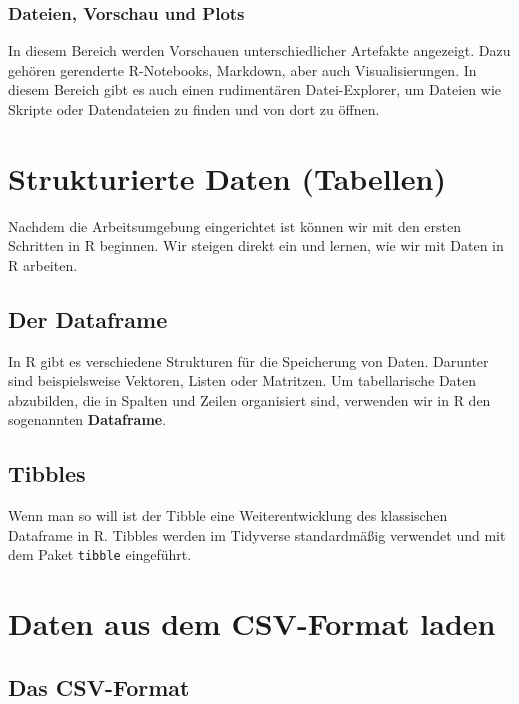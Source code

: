 \documentclass[
]{book}
\begin{document}
\hypertarget{dateien-vorschau-und-plots}{%
\subsection{Dateien, Vorschau und Plots}\label{dateien-vorschau-und-plots}}

In diesem Bereich werden Vorschauen unterschiedlicher Artefakte angezeigt. Dazu gehören gerenderte R-Notebooks, Markdown, aber auch Visualisierungen. In diesem Bereich gibt es auch einen rudimentären Datei-Explorer, um Dateien wie Skripte oder Datendateien zu finden und von dort zu öffnen.

\hypertarget{strukturierte-daten-tabellen}{%
\chapter{Strukturierte Daten (Tabellen)}\label{strukturierte-daten-tabellen}}

Nachdem die Arbeitsumgebung eingerichtet ist können wir mit den ersten Schritten in R beginnen. Wir steigen direkt ein und lernen, wie wir mit Daten in R arbeiten.

\hypertarget{der-dataframe}{%
\section{Der Dataframe}\label{der-dataframe}}

In R gibt es verschiedene Strukturen für die Speicherung von Daten. Darunter sind beispielsweise Vektoren, Listen oder Matritzen. Um tabellarische Daten abzubilden, die in Spalten und Zeilen organisiert sind, verwenden wir in R den sogenannten \textbf{Dataframe}.

\hypertarget{tibbles}{%
\section{Tibbles}\label{tibbles}}

Wenn man so will ist der Tibble eine Weiterentwicklung des klassischen Dataframe in R. Tibbles werden im Tidyverse standardmäßig verwendet und mit dem Paket \texttt{tibble} eingeführt.

\hypertarget{daten-aus-dem-csv-format-laden}{%
\chapter{Daten aus dem CSV-Format laden}\label{daten-aus-dem-csv-format-laden}}

\hypertarget{das-csv-format}{%
\section{Das CSV-Format}\label{das-csv-format}}
\end{document}

